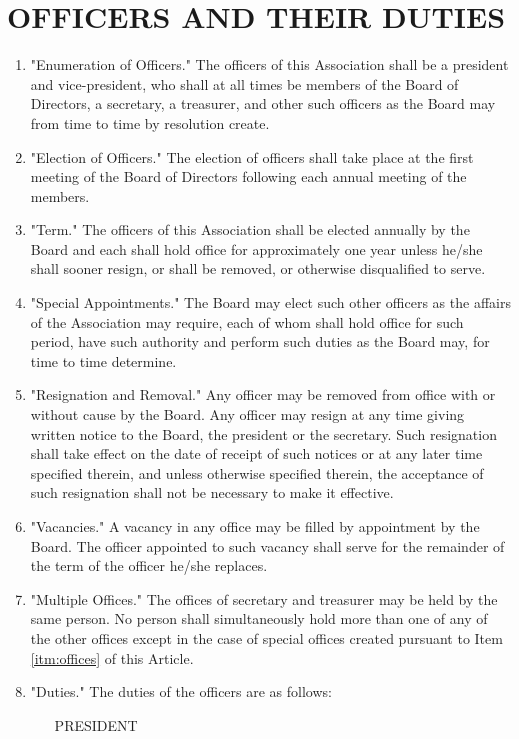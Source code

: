 \documentclass[12pt, letterpaper]{article}
\begin{document}
\section{OFFICERS AND THEIR DUTIES}
\begin{enumerate}
 \item "Enumeration of Officers."
  The officers of this Association shall be a president and vice-president, who shall at all times be members of the Board of Directors, a secretary, a treasurer, and other such officers as the Board may from time to time by resolution create.
 \item "Election of Officers."
  The election of officers shall take place at the first meeting of the Board of Directors following each annual meeting of the members.
 \item "Term."
  The officers of this Association shall be elected annually by the Board and each shall hold office for approximately one year unless he/she shall sooner resign, or shall be removed, or otherwise disqualified to serve.
 \item "Special Appointments." \label{itm:offices}
  The Board may elect such other officers as the affairs of the Association may require, each of whom shall hold office for such period, have such authority and perform such duties as the Board may, for time to time determine.
 \item "Resignation and Removal."
  Any officer may be removed from office with or without cause by the Board.
  Any officer may resign at any time giving written notice to the Board, the president or the secretary.
  Such resignation shall take effect on the date of receipt of such notices or at any later time specified therein, and unless otherwise specified therein, the acceptance of such resignation shall not be necessary to make it effective.
 \item "Vacancies."
  A vacancy in any office may be filled by appointment by the Board.
  The officer appointed to such vacancy shall serve for the remainder of the term of the officer he/she replaces.
 \item "Multiple Offices."
  The offices of secretary and treasurer may be held by the same person.
  No person shall simultaneously hold more than one of any of the other offices except in the case of special offices created pursuant to Item \ref{itm:offices} of this Article. 
 \item "Duties."
  The duties of the officers are as follows:
  \begin{itemize}
   \item[PRESIDENT]

\end{itemize}
\end{enumerate}
\end{document}
